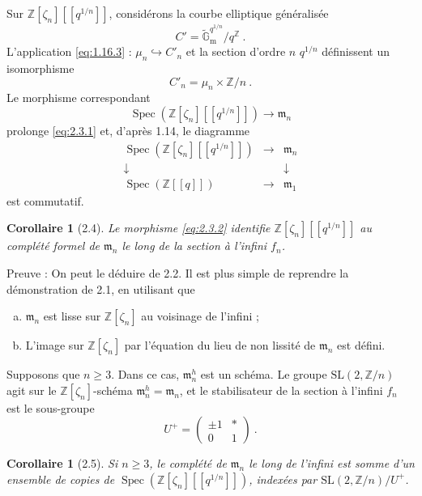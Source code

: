 \documentclass[12pt,a4paper]{amsart}
\theoremstyle{plain}
\newtheorem{corollaire}[proposition]{Corollaire}
\theoremstyle{definition}
\theoremstyle{remark}
\DeclareMathOperator{\Spec}{Spec}
\newcommand{\ZZ}{\mathbb{Z}}
\newcommand{\Gmtilde}{\widetilde{\mathbb{G}}_\mathrm{m}}
\begin{document}
Sur $\ZZ[\zeta_n][[q^{1/n}]]$, consid\'erons la courbe elliptique g\'en\'eralis\'ee
\[
C' = \Gmtilde^{q^{1/n}} / q^{\ZZ} \ .
\]
L'application \eqref{eq:1.16.3} : $\mu_n \hookrightarrow C'_n$ et la section d'ordre $n$ $q^{1/n}$ d\'efinissent un isomorphisme
\[
C'_n = \mu_n \times \ZZ/n \ .
\]
Le morphisme correspondant
\begin{equation}\label{eq:2.3.2}
\Spec(\ZZ[\zeta_n][[q^{1/n}]]) \longrightarrow \mathfrak{m}_n
\end{equation}
prolonge \eqref{eq:2.3.1} et, d'apr\`es 1.14, le diagramme
\[
\begin{array}{ccc}
\Spec(\ZZ[\zeta_n][[q^{1/n}]]) & \longrightarrow & \mathfrak{m}_n \\
\downarrow & & \downarrow \\
\Spec(\ZZ[[q]]) & \longrightarrow & \mathfrak{m}_1
\end{array}
\]
est commutatif.

\begin{corollaire}[2.4]
Le morphisme \eqref{eq:2.3.2} identifie $\ZZ[\zeta_n][[q^{1/n}]]$ au compl\'et\'e formel de $\mathfrak{m}_n$ le long de la section \`a l'infini $f_n$.
\end{corollaire}

\noindent Preuve : On peut le d\'eduire de 2.2. Il est plus simple de reprendre la d\'emonstration de 2.1, en utilisant que
\begin{enumerate}[a)]
\item $\mathfrak{m}_n$ est lisse sur $\ZZ[\zeta_n]$ au voisinage de l'infini ;
\item L'image sur $\ZZ[\zeta_n]$ par l'\'equation du lieu de non lissit\'e de $\mathfrak{m}_n$ est d\'efini.
\end{enumerate}

Supposons que $n \geq 3$. Dans ce cas, $\mathfrak{m}_n^h$ est un sch\'ema. Le groupe $\mathrm{SL}(2, \ZZ/n)$ agit sur le $\ZZ[\zeta_n]$-sch\'ema $\mathfrak{m}_n^h = \mathfrak{m}_n$, et le stabilisateur de la section \`a l'infini $f_n$ est le sous-groupe
\[
U^+ = \begin{pmatrix} \pm 1 & * \\ 0 & 1 \end{pmatrix} \ .
\]

\begin{corollaire}[2.5]
Si $n \geq 3$, le compl\'et\'e de $\mathfrak{m}_n$ le long de l'infini est somme d'un ensemble de copies de $\Spec(\ZZ[\zeta_n][[q^{1/n}]])$, index\'ees par $\mathrm{SL}(2, \ZZ/n) / U^+$.
\end{corollaire}
\end{document}
